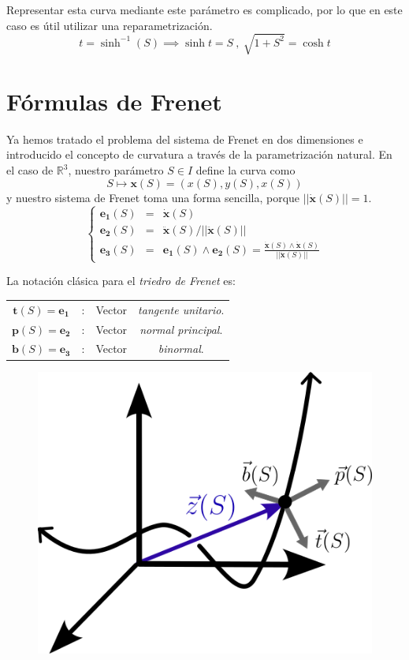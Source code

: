 \begin{mybox}
    Representar esta curva mediante este parámetro es complicado, por lo que en este caso es útil utilizar una reparametrización.
    $$
    t=\sinh^{-1}(S)\implies \sinh{t}=S \ , \ \sqrt{1+S^2}=\cosh{t}
    $$
    
\end{mybox}

\section{Fórmulas de Frenet}
 Ya hemos tratado el problema del sistema de Frenet en dos dimensiones e introducido el concepto de curvatura a través de la parametrización natural. En el caso de $\mathbb{R}^3$, nuestro parámetro $S\in I$ define la curva como 
 $$
 S\longmapsto \mathbf{x}(S)=(x(S),y(S),x(S))
 $$
 y nuestro sistema de Frenet toma una forma sencilla, porque $||\dot{\mathbf{x}}(S)||=1$.
 $$
 \left \{
 \begin{array}{ccc}
      \mathbf{e_1}(S)&=&\dot{\mathbf{x}}(S)  \\
      \mathbf{e_2}(S)&=&\ddot{\mathbf{x}}(S)/||\ddot{\mathbf{x}}(S)||\\
      \mathbf{e_3}(S)&=&\mathbf{e_1}(S)\wedge \mathbf{e_2}(S)=\frac{\dot{\mathbf{x}}(S)\wedge \ddot{\mathbf{x}}(S)}{||\ddot{\mathbf{x}}(S)||}
 \end{array}
 \right .
 $$

 La notación clásica para el \emph{triedro de Frenet} es:
 \begin{center}
\begin{tabular}{cccc}
     $\mathbf{t}(S)=\mathbf{e_1}$ &:& Vector& \emph{tangente unitario}.\\
     $\mathbf{p}(S)=\mathbf{e_2}$ &:& Vector& \emph{normal principal}.\\
     $\mathbf{b}(S)=\mathbf{e_3}$ &:& Vector& \emph{binormal}.\\
\end{tabular}
\end{center}


\begin{figure}
    \centering
    \includegraphics[scale=.4]{FOTOS/frenet_3d.png}
\end{figure}

